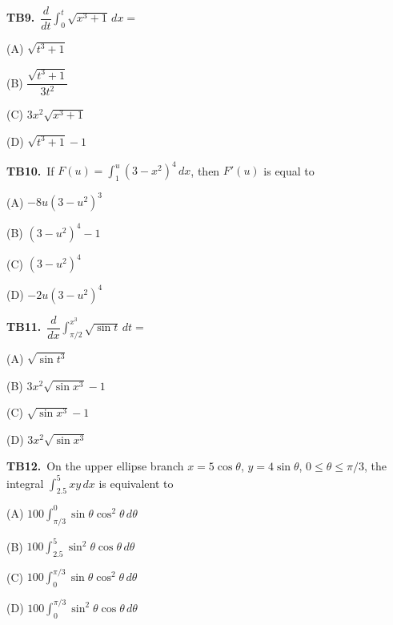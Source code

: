 \documentclass[11pt]{article}
\begin{document}
\bigskip\noindent\textbf{TB9.}\ $\displaystyle\dfrac{d}{dt}\int_{0}^{t} \sqrt{x^3+1}\,dx =$
\begin{list}{}{\setlength{\leftmargin}{3em}\setlength{\labelwidth}{2.5em}\setlength{\itemsep}{0pt}\setlength{\topsep}{2pt}}
\item[(A)] $\sqrt{t^3+1}$
\item[(B)] $\dfrac{\sqrt{t^3+1}}{3t^2}$
\item[(C)] $3x^2\sqrt{x^3+1}$
\item[(D)] $\sqrt{t^3+1}-1$
\end{list}

\bigskip\noindent\textbf{TB10.}\ If $F(u) = \displaystyle\int_{1}^{u} (3-x^2)^4\,dx$, then $F'(u)$ is equal to
\begin{list}{}{\setlength{\leftmargin}{3em}\setlength{\labelwidth}{2.5em}\setlength{\itemsep}{0pt}\setlength{\topsep}{2pt}}
\item[(A)] $-8u(3-u^2)^3$
\item[(B)] $(3-u^2)^4-1$
\item[(C)] $(3-u^2)^4$
\item[(D)] $-2u(3-u^2)^4$
\end{list}

\bigskip\noindent\textbf{TB11.}\ $\displaystyle\dfrac{d}{dx}\int_{\pi/2}^{x^3} \sqrt{\sin t}\,dt =$
\begin{list}{}{\setlength{\leftmargin}{3em}\setlength{\labelwidth}{2.5em}\setlength{\itemsep}{0pt}\setlength{\topsep}{2pt}}
\item[(A)] $\sqrt{\sin t^3}$
\item[(B)] $3x^2\sqrt{\sin x^3}-1$
\item[(C)] $\sqrt{\sin x^3}-1$
\item[(D)] $3x^2\sqrt{\sin x^3}$
\end{list}

\bigskip\noindent\textbf{TB12.}\ On the upper ellipse branch $x=5\cos\theta$, $y=4\sin\theta$, $0\leq\theta\leq\pi/3$, the integral $\int_{2.5}^5xy\,dx$ is equivalent to
\begin{list}{}{\setlength{\leftmargin}{3em}\setlength{\labelwidth}{2.5em}\setlength{\itemsep}{0pt}\setlength{\topsep}{2pt}}
\item[(A)] $\displaystyle 100\int_{\pi/3}^{0} \sin\theta\cos^2\theta\,d\theta$
\item[(B)] $\displaystyle 100\int_{2.5}^{5} \sin^2\theta\cos\theta\,d\theta$
\item[(C)] $\displaystyle 100\int_{0}^{\pi/3} \sin\theta\cos^2\theta\,d\theta$
\item[(D)] $\displaystyle 100\int_{0}^{\pi/3} \sin^2\theta\cos\theta\,d\theta$
\end{list}
\end{document}
